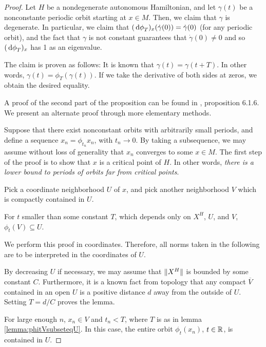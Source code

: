 \begin{proof}
Let $H$ be a nondegenerate autonomous Hamiltonian, and let $\gamma(t)$ be a nonconstante periodic orbit starting at $x \in M$. Then, we claim that $\gamma$ is degenerate. In particular, we claim that $(\dl \phi_T)_x(\dot \gamma(0)) = \dot \gamma(0)$ (for any periodic orbit), and the fact that $\gamma$ is not constant guarantees that $\dot \gamma(0) \neq 0$ and so $(\dl \phi_T)_x$ has 1 as an eigenvalue.

The claim is proven as follows: It is known that $\gamma(t) = \gamma(t+T)$. In other words, $\gamma(t) = \phi_T(\gamma(t))$. If we take the derivative of both sides at zeros, we obtain the desired equality.

\smallskip

A proof of the second part of the proposition can be found in \cite{audin}, proposition 6.1.6. We present an alternate proof through more elementary methods.

Suppose that there exist nonconstant orbits with arbitrarily small periods, and define a sequence $x_n = \phi_{t_n} x_n$, with $t_n \to 0$. By taking a subsequence, we may assume without loss of generality that $x_n$ converges to some $x \in M$. The first step of the proof is to show that $x$ is a critical point of $H$. In other words, \emph{there is a lower bound to periods of orbits far from critical points}.

Pick a coordinate neighborhood $U$ of $x$, and pick another neighborhood $V$ which is compactly contained in $U$.

\begin{lemma}\label{lemma:phitVsubseteqU}
For $t$ smaller than some constant $T$, which depends only on $X^H$, $U$, and $V$, $\phi_t(V) \subseteq U$.
\end{lemma}

\begin{lemmaproof}
We perform this proof in coordinates. Therefore, all norms taken in the following are to be interpreted in the coordinates of $U$.

By decreasing $U$ if necessary, we may assume that $\lVert X^H\rVert$ is bounded by some constant $C$. Furthermore, it is a known fact from topology that any compact $\overline{V}$ contained in an open $U$ is a positive distance $d$ away from the outside of $U$. Setting $T = d/C$ proves the lemma.
\end{lemmaproof}

For large enough $n$, $x_n \in V$ and $t_n < T$, where $T$ is as in lemma \ref{lemma:phitVsubseteqU}. In this case, the entire orbit $\phi_t(x_n)$, $t \in \mathbb{R}$, is contained in $U$.


\end{proof}
